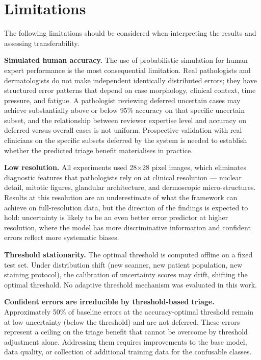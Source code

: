 \section{Limitations}

The following limitations should be considered when interpreting the results and assessing transferability.

\textbf{Simulated human accuracy.} The use of probabilistic simulation for human expert performance is the most consequential limitation. Real pathologists and dermatologists do not make independent identically distributed errors; they have structured error patterns that depend on case morphology, clinical context, time pressure, and fatigue. A pathologist reviewing deferred uncertain cases may achieve substantially above or below 95\% accuracy on that specific uncertain subset, and the relationship between reviewer expertise level and accuracy on deferred versus overall cases is not uniform. Prospective validation with real clinicians on the specific subsets deferred by the system is needed to establish whether the predicted triage benefit materialises in practice.

\textbf{Low resolution.} All experiments used 28$\times$28 pixel images, which eliminates diagnostic features that pathologists rely on at clinical resolution --- nuclear detail, mitotic figures, glandular architecture, and dermoscopic micro-structures. Results at this resolution are an underestimate of what the framework can achieve on full-resolution data, but the direction of the findings is expected to hold: uncertainty is likely to be an even better error predictor at higher resolution, where the model has more discriminative information and confident errors reflect more systematic biases.

\textbf{Threshold stationarity.} The optimal threshold is computed offline on a fixed test set. Under distribution shift (new scanner, new patient population, new staining protocol), the calibration of uncertainty scores may drift, shifting the optimal threshold. No adaptive threshold mechanism was evaluated in this work.

\textbf{Confident errors are irreducible by threshold-based triage.} Approximately 50\% of baseline errors at the accuracy-optimal threshold remain at low uncertainty (below the threshold) and are not deferred. These errors represent a ceiling on the triage benefit that cannot be overcome by threshold adjustment alone. Addressing them requires improvements to the base model, data quality, or collection of additional training data for the confusable classes.

